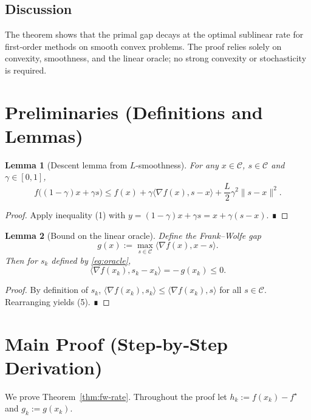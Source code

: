 \documentclass{article}
\newtheorem{lemma}{Lemma}
\begin{document}
\subsection*{Discussion}
The theorem shows that the primal gap decays at the optimal sublinear rate for first‑order methods on smooth convex problems. The proof relies solely on convexity, smoothness, and the linear oracle; no strong convexity or stochasticity is required.

\section*{Preliminaries (Definitions and Lemmas)}
\begin{lemma}[Descent lemma from $L$‑smoothness]\label{lem:descent}
For any $x\in\mathcal{C}$, $s\in\mathcal{C}$ and $\gamma\in[0,1]$,
\[
f\bigl((1-\gamma)x+\gamma s\bigr) \le
f(x) + \gamma\langle\nabla f(x),s-x\rangle + \frac{L}{2}\gamma^{2}\|s-x\|^{2}.
\tag{4}
\]
\end{lemma}
\begin{proof}
Apply inequality (1) with $y=(1-\gamma)x+\gamma s = x+\gamma(s-x)$. ∎
\end{proof}

\begin{lemma}[Bound on the linear oracle]\label{lem:gap}
Define the Frank–Wolfe gap
\[
g(x) := \max_{s\in\mathcal{C}}\langle\nabla f(x),x-s\rangle .
\]
Then for $s_k$ defined by \eqref{eq:oracle},
\[
\langle\nabla f(x_k),s_k-x_k\rangle = -\,g(x_k) \le 0 .
\tag{5}
\]
\end{lemma}
\begin{proof}
By definition of $s_k$, $\langle\nabla f(x_k),s_k\rangle \le \langle\nabla f(x_k),s\rangle$ for all $s\in\mathcal{C}$. Rearranging yields (5). ∎
\end{proof}

\section*{Main Proof (Step‑by‑Step Derivation)}
We prove Theorem~\ref{thm:fw-rate}.  Throughout the proof let $h_k:=f(x_k)-f^\star$ and $g_k:=g(x_k)$.
\end{document}
